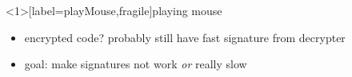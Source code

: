 
\begin{frame}<1>[label=playMouse,fragile]{playing mouse}
    \begin{itemize}
    \item encrypted code? probably still have fast signature from decrypter
    \item goal: make signatures not work \textit{or} really slow
    \end{itemize}
\end{frame}


